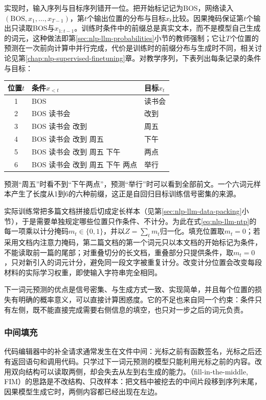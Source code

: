实现时，输入序列与目标序列错开一位。把开始标记记为BOS，网络读入$(\mathrm{BOS},x_1,\ldots,x_{T-1})$，第$t$个输出位置的分布与目标$x_t$比较。因果掩码保证第$t$个输出只读取BOS与$x_{1:t-1}$。训练时条件中的前缀总是真实文本，而不是模型自己生成的词元，这种做法即第\ref{sec:nlp-llm-probabilities}小节的教师强制；它让$T$个位置的预测在一次前向计算中并行完成，代价是训练时的前缀分布与生成时不同，相关讨论见第\ref{chap:nlp-supervised-finetuning}章。对教学序列，下表列出每条记录的条件与目标：
\begin{center}
 \begin{tabular}{@{}cll@{}}
  \toprule
  位置$t$ & 条件$x_{<t}$ & 目标$x_t$\\
  \midrule
  1 & BOS & 读书会\\
  2 & BOS 读书会 & 改到\\
  3 & BOS 读书会 改到 & 周五\\
  4 & BOS 读书会 改到 周五 & 下午\\
  5 & BOS 读书会 改到 周五 下午 & 两点\\
  6 & BOS 读书会 改到 周五 下午 两点 & 举行\\
  \bottomrule
 \end{tabular}
\end{center}
预测“周五”时看不到“下午两点”，预测“举行”时可以看到全部前文。一个六词元样本产生了长度从1到6的六种前缀，这正是自回归目标训练信号密集的来源。

实际训练常把多篇文档拼接后切成定长样本（见第\ref{sec:nlp-llm-data-packing}小节），于是需要单独规定哪些位置只作条件、不计分。为此在式\eqref{eq:nlp-llm-ntp}的每一项乘以计分掩码$m_t\in\{0,1\}$，并以$Z=\sum_t m_t$归一化。填充位置取$m_t=0$；若采用文档内注意力掩码，第二篇文档的第一个词元只以本文档的开始标记为条件，不能读取前一篇的尾部；对重叠切分的长文档，重叠部分只提供条件，取$m_t=0$，只对新引入的词元计分，避免同一段文字被重复计分。改变计分位置会改变每段材料的实际学习权重，即使输入字符串完全相同。

下一词元预测的优点是信号密集、与生成方式一致、实现简单，并且每个位置的损失有明确的概率意义，可以直接计算困惑度。它的不足也来自同一个约束：条件只有左侧，既不能直接完成需要右侧信息的填空，也只对一步之后的词元负责。

\subsubsection{中间填充}
\label{sec:nlp-llm-objective-fim}

代码编辑器中的补全请求通常发生在文件中间：光标之前有函数签名，光标之后还有返回语句和调用代码。只学过下一词元预测的模型只能利用光标之前的内容。改用双向结构可以读取两侧，却会失去从左到右生成的能力。（fill-in-the-middle, FIM）的思路是不改结构、只改样本：把文档中被挖去的中间片段移到序列末尾，因果模型生成它时，两侧内容都已经出现在左边。

